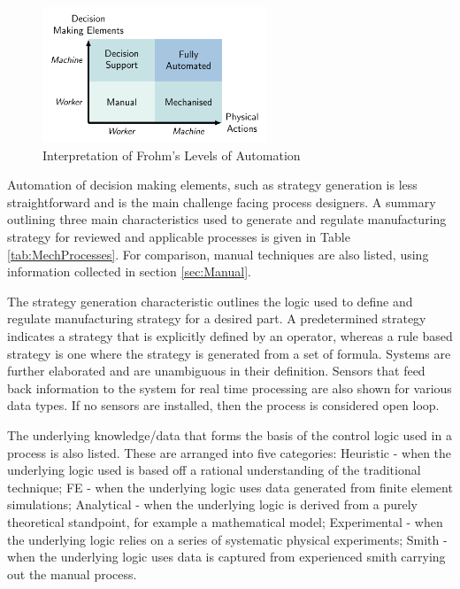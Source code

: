 \begin{figure}[h]
    \centering
    \includegraphics[width=0.6\textwidth]{Diagrams/LoADiagram.pdf}
    \caption{Interpretation of Frohm's \citep{Frohm2008LevelsManufacturing} Levels of Automation}
    \label{fig:my_label}
\end{figure}

Automation of decision making elements, such as  strategy generation is less straightforward and is the main challenge facing process designers. A summary outlining three main characteristics used to generate and regulate manufacturing strategy for reviewed and applicable processes is given in Table \ref{tab:MechProcesses}. For comparison, manual techniques are also listed, using information collected in section \ref{sec:Manual}.

The strategy generation characteristic outlines the logic used to define and regulate manufacturing strategy for a desired part. A predetermined strategy indicates a strategy that is explicitly defined by an operator, whereas a rule based strategy is one where the strategy is generated from a set of formula. Systems are further elaborated and are unambiguous in their definition. Sensors that feed back information to the system for real time processing are also shown for various data types. If no sensors are installed, then the process is considered open loop.

The underlying knowledge/data that forms the basis of the control logic used in a process is also listed. These are arranged into five categories: Heuristic - when the underlying logic used is based off a rational understanding of the traditional technique; FE - when the underlying logic uses data generated from finite element simulations; Analytical - when the underlying logic is derived from a purely theoretical standpoint, for example a mathematical model; Experimental - when the underlying logic relies on a series of systematic physical experiments; Smith - when the underlying logic uses data is captured from experienced smith carrying out the manual process.

